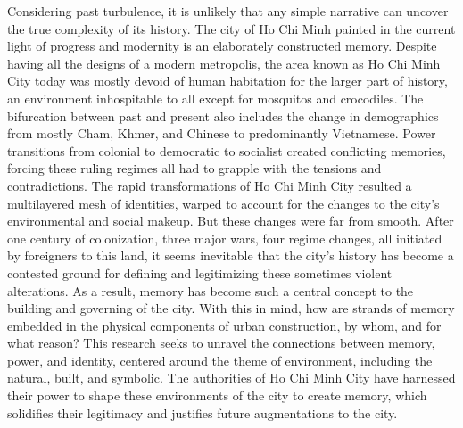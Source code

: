 Considering past turbulence, it is unlikely that any simple narrative can uncover the true complexity of its history. The city of Ho Chi Minh painted in the current light of progress and modernity is an elaborately constructed memory.  Despite having all the designs of a modern metropolis, the area known as Ho Chi Minh City today was mostly devoid of human habitation for the larger part of history, an environment inhospitable to all except for mosquitos and crocodiles. The bifurcation between past and present also includes the change in demographics from mostly Cham, Khmer, and Chinese to predominantly Vietnamese. Power transitions from colonial to democratic to socialist created conflicting memories, forcing these ruling regimes all had to grapple with the tensions and contradictions. The rapid transformations of Ho Chi Minh City resulted a multilayered mesh of identities, warped to account for the changes to the city's environmental and social makeup. But these changes were far from smooth. After one century of colonization, three major wars, four regime changes, all initiated by foreigners to this land, it seems inevitable that the city’s history has become a contested ground for defining and legitimizing these sometimes violent alterations. As a result, memory has become such a central concept to the building and governing of the city. With this in mind, how are strands of memory embedded in the physical components of urban construction, by whom, and for what reason? This research seeks to unravel the connections between memory, power, and identity, centered around the theme of environment, including the natural, built, and symbolic. The authorities of Ho Chi Minh City have harnessed their power to shape these environments of the city to create memory, which solidifies their legitimacy and justifies future augmentations to the city.

